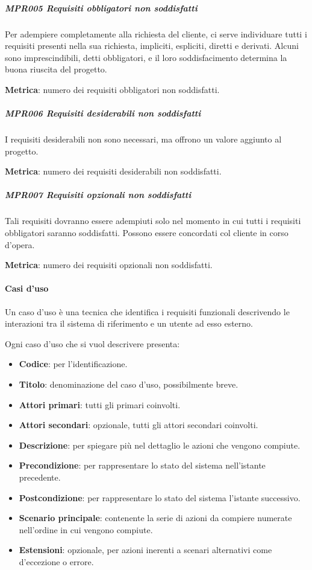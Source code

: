 		\subparagraph{MPR005 Requisiti obbligatori non soddisfatti}
		Per adempiere completamente alla richiesta del cliente, ci serve individuare tutti i requisiti presenti nella sua richiesta, impliciti, espliciti, diretti e derivati. Alcuni sono imprescindibili, detti obbligatori, e il loro soddisfacimento determina la buona riuscita del progetto.

		\textbf{Metrica}: numero dei requisiti obbligatori non soddisfatti.

		\subparagraph{MPR006 Requisiti desiderabili non soddisfatti}
		I requisiti desiderabili non sono necessari, ma offrono un valore aggiunto al progetto.

		\textbf{Metrica}: numero dei requisiti desiderabili non soddisfatti.

		\subparagraph{MPR007 Requisiti opzionali non soddisfatti}
		Tali requisiti dovranno essere adempiuti solo nel momento in cui tutti i requisiti obbligatori saranno soddisfatti.
		Possono essere concordati col cliente in corso d'opera.

		\textbf{Metrica}: numero dei requisiti opzionali non soddisfatti.


		\paragraph{Casi d'uso}\label{PP:Sviluppo:AdR:CasiUso}
		Un caso d'uso è una tecnica che identifica i requisiti funzionali descrivendo le interazioni tra il sistema di riferimento e un utente ad esso esterno.\par
		Ogni caso d'uso che si vuol descrivere presenta:
		\begin{itemize}
		 	\item \textbf{Codice}: per l'identificazione.
		 	\item \textbf{Titolo}: denominazione del caso d'uso, possibilmente breve.
		 	\item \textbf{Attori primari}: tutti gli  primari coinvolti.
		 	\item \textbf{Attori secondari}: opzionale, tutti gli attori secondari coinvolti.
		 	\item \textbf{Descrizione}: per spiegare più nel dettaglio le azioni che vengono compiute.
		 	\item \textbf{Precondizione}: per rappresentare lo stato del sistema nell'istante precedente.
		 	\item \textbf{Postcondizione}: per rappresentare lo stato del sistema l'istante successivo.
		 	\item \textbf{Scenario principale}: contenente la serie di azioni da compiere numerate nell'ordine in cui vengono compiute.
		 	\item \textbf{Estensioni}: opzionale, per azioni inerenti a scenari alternativi come d'eccezione o errore.
		\end{itemize}

